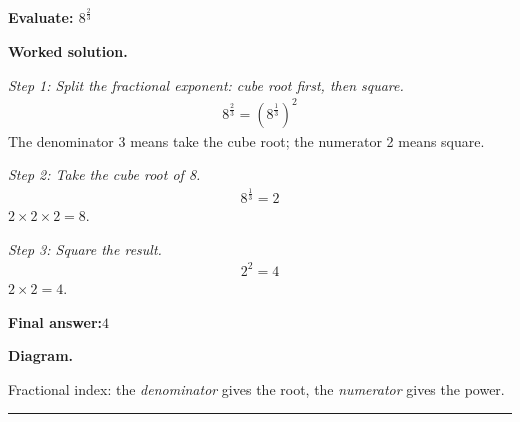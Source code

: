\documentclass[11pt]{article}
\newcommand{\question}[1]{\par\medskip\noindent\textbf{#1}\par}
\begin{document}
\question{Evaluate: \( 8^{\frac{2}{3}} \)}

\textbf{Worked solution.}

\textit{Step 1: Split the fractional exponent: cube root first, then square.}
\[\begin{gathered}
8^{\frac{2}{3}} = \left(8^{\frac{1}{3}}\right)^2
\end{gathered}\]
The denominator 3 means take the cube root; the numerator 2 means square.

\textit{Step 2: Take the cube root of 8.}
\[\begin{gathered}
8^{\frac{1}{3}} = 2
\end{gathered}\]
\( 2 \times 2 \times 2 = 8 \).

\textit{Step 3: Square the result.}
\[\begin{gathered}
2^2 = 4
\end{gathered}\]
\( 2 \times 2 = 4 \).

\begin{answerbox}
\textbf{Final answer:}\quad \(\displaystyle 4\)
\end{answerbox}
\textbf{Diagram.}

\begin{center}
\end{center}
\small Fractional index: the \emph{denominator} gives the root, the \emph{numerator} gives the power.\normalsize

\medskip\hrule
\end{document}

